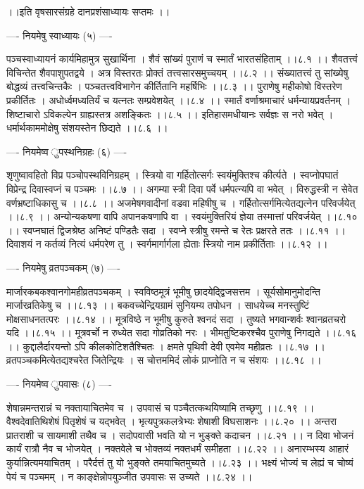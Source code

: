\documentclass[11pt]{book}
\begin{document}
\begin{landscape}
 ।।इति वृषसारसंग्रहे दानप्रशंसाध्यायः सप्तमः ।।





---- नियमेषु स्वाध्यायः (५) ----

पञ्चस्वाध्यायनं कार्यमिहामुत्र सुखार्थिना ।
शैवं सांख्यं पुराणं च स्मार्तं भारतसंहिताम् ।।८.१ ।।
शैवतत्त्वं विचिन्तेत शैवपाशुपतद्वये ।
अत्र विस्तरतः प्रोक्तं तत्त्वसारसमुच्चयम् ।।८.२ ।।
संख्यातत्त्वं तु सांख्येषु बोद्धव्यं तत्त्वचिन्तकैः ।
पञ्चतत्त्वविभागेन कीर्तितानि महर्षिभिः ।।८.३ ।।
पुराणेषु महीकोषो विस्तरेण प्रकीर्तितः ।
अधोर्ध्वमध्यतिर्यं च यत्नतः सम्प्रवेशयेत् ।।८.४ ।।
स्मार्तं वर्णाश्रमाचारं धर्मन्यायप्रवर्तनम् ।
शिष्टाचारो ऽविकल्पेन ग्राह्यस्तत्र अशङ्कितः ।।८.५ ।।
इतिहासमधीयानः सर्वज्ञः स नरो भवेत् ।
धर्मार्थकाममोक्षेषु संशयस्तेन छिद्यते ।।८.६ ।।

---- नियमेष्व{ }ुपस्थनिग्रहः (६) ----

शृणुष्वावहितो विप्र पञ्चोपस्थविनिग्रहम् ।
स्त्रियो वा गर्हितोत्सर्गः स्वयंमुक्तिश्च कीर्त्यते ।
स्वप्नोपघातं विप्रेन्द्र दिवास्वप्नं च पञ्चमः ।।८.७ ।।
अगम्या स्त्री दिवा पर्वे धर्मपत्न्यपि वा भवेत् ।
विरुद्धस्त्री न सेवेत वर्णभ्रष्टाधिकासु च ।।८.८ ।।
अजमेषगवादीनां वडवा महिषीषु च ।
गर्हितोत्सर्गमित्येतद्यत्नेन परिवर्जयेत् ।।८.९ ।।
अन्योन्यकषणा वापि अपानकषणापि वा ।
स्वयंमुक्तिरियं ज्ञेया तस्मात्तां परिवर्जयेत् ।।८.१० ।।
स्वप्नघातं द्विजश्रेष्ठ अनिष्टं पण्डितैः सदा ।
स्वप्ने स्त्रीषु रमन्ते च रेतः प्रक्षरते ततः ।।८.११ ।।
दिवाशयं न कर्तव्यं नित्यं धर्मपरेण तु । 
स्वर्गमार्गार्गला ह्येताः स्त्रियो नाम प्रकीर्तिताः ।।८.१२ ।।

---- नियमेषु व्रतपञ्चकम् (७) ----

मार्जारकबकश्वानगोमहीव्रतपञ्चकम् ।
स्वविष्ठमूत्रं भूमीषु छादयेद्द्विजसत्तम ।
सूर्यसोमानुमोदन्ति मार्जारव्रतिकेषु च ।।८.१३ ।।
बकवच्चेन्द्रियग्रामं सुनियम्य तपोधन ।
साधयेच्च मनस्तुष्टिं मोक्षसाधनतत्परः ।।८.१४ ।।
मूत्रविष्ठे न भूमीषु कुरुते श्वनदं सदा ।
तुष्यते भगवान्शर्वः श्वानव्रतचरो यदि ।।८.१५ ।।
मूत्रवर्चो न रुध्येत सदा गोव्रतिको नरः ।
भीमतुष्टिकरश्चैव पुराणेषु निगद्यते ।।८.१६ ।।
कुद्दालैर्दारयन्तो ऽपि कीलकोटिशतैश्चितः ।
क्षमते पृथिवी देवी एवमेव महीव्रतः ।।८.१७ ।।
व्रतपञ्चकमित्येतद्यश्चरेत जितेन्द्रियः ।
स चोत्तममिदं लोकं प्राप्नोति न च संशयः ।।८.१८ ।।

---- नियमेष्व{ }ुपवासः (८) ----

शेषान्नमन्तरान्नं च नक्तायाचितमेव च ।
उपवासं च पञ्चैतत्कथयिष्यामि तच्छृणु ।।८.१९ ।।
वैश्वदेवातिथिशेषं पितृशेषं च यद्भवेत् ।
भृत्यपुत्रकलत्रेभ्यः शेषाशी विघसाशनः ।।८.२० ।।
अन्तरा प्रातराशी च सायमाशी तथैव च ।
सदोपवासी भवति यो न भुङ्क्ते कदाचन ।।८.२१ ।।
न दिवा भोजनं कार्यं रात्रौ नैव च भोजयेत् ।
नक्तवेले च भोक्तव्यं नक्तधर्मं समीहता ।।८.२२ ।।
अनारम्भस्य आहारं कुर्यान्नित्यमयाचितम् ।
परैर्दत्तं तु यो भुङ्क्ते तमयाचितमुच्यते ।।८.२३ ।।
भक्ष्यं भोज्यं च लेह्यं च चोष्यं पेयं च पञ्चमम् ।
न काङ्क्षेन्नोपयुञ्जीत उपवासः स उच्यते ।।८.२४ ।।


\end{landscape}
\end{document}
